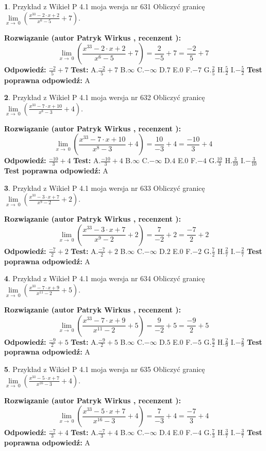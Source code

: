 \documentclass[12pt, a4paper]{article}
\theoremstyle{definition} %
\newtheorem{zad}{}
\newcommand{\zadStart}[1]{\begin{zad}#1\newline}
\newcommand{\zadStop}{\end{zad}}
\newcommand{\rozwStart}[2]{\noindent \textbf{Rozwiązanie (autor #1 , recenzent #2): }\newline}
\newcommand{\rozwStop}{\newline}
\newcommand{\odpStart}{\noindent \textbf{Odpowiedź:}\newline}
\newcommand{\odpStop}{\newline}
\newcommand{\testStart}{\noindent \textbf{Test:}\newline}
\newcommand{\testStop}{\newline}
\newcommand{\kluczStart}{\noindent \textbf{Test poprawna odpowiedź:}\newline}
\newcommand{\kluczStop}{\newline}
\begin{document}
\zadStart{Przykład z Wikieł P 4.1 moja wersja nr 631}
Obliczyć granicę $\lim\limits_{x\to\ 0}(\frac{x^{33}-2 \cdot x +2}{x^{6}-5}+7)$.
\zadStop
\rozwStart{Patryk Wirkus}{}
$$\lim\limits_{x\to\ 0}(\frac{x^{33}-2 \cdot x +2}{x^{6}-5}+7)=\frac{2}{-5}+7=\frac{-2}{5}+7$$
\rozwStop
\odpStart
$\frac{-2}{5}+7$
\odpStop
\testStart
A.$\frac{-2}{5}+7$
B.$\infty$
C.$-\infty$
D.$7$
E.$0$
F.$-7$
G.$\frac{2}{5}$
H.$\frac{5}{2}$
I.$-\frac{5}{2}$
\testStop
\kluczStart
A
\kluczStop



\zadStart{Przykład z Wikieł P 4.1 moja wersja nr 632}
Obliczyć granicę $\lim\limits_{x\to\ 0}(\frac{x^{33}-7 \cdot x +10}{x^{8}-3}+4)$.
\zadStop
\rozwStart{Patryk Wirkus}{}
$$\lim\limits_{x\to\ 0}(\frac{x^{33}-7 \cdot x +10}{x^{8}-3}+4)=\frac{10}{-3}+4=\frac{-10}{3}+4$$
\rozwStop
\odpStart
$\frac{-10}{3}+4$
\odpStop
\testStart
A.$\frac{-10}{3}+4$
B.$\infty$
C.$-\infty$
D.$4$
E.$0$
F.$-4$
G.$\frac{10}{3}$
H.$\frac{3}{10}$
I.$-\frac{3}{10}$
\testStop
\kluczStart
A
\kluczStop



\zadStart{Przykład z Wikieł P 4.1 moja wersja nr 633}
Obliczyć granicę $\lim\limits_{x\to\ 0}(\frac{x^{33}-3 \cdot x +7}{x^{9}-2}+2)$.
\zadStop
\rozwStart{Patryk Wirkus}{}
$$\lim\limits_{x\to\ 0}(\frac{x^{33}-3 \cdot x +7}{x^{9}-2}+2)=\frac{7}{-2}+2=\frac{-7}{2}+2$$
\rozwStop
\odpStart
$\frac{-7}{2}+2$
\odpStop
\testStart
A.$\frac{-7}{2}+2$
B.$\infty$
C.$-\infty$
D.$2$
E.$0$
F.$-2$
G.$\frac{7}{2}$
H.$\frac{2}{7}$
I.$-\frac{2}{7}$
\testStop
\kluczStart
A
\kluczStop



\zadStart{Przykład z Wikieł P 4.1 moja wersja nr 634}
Obliczyć granicę $\lim\limits_{x\to\ 0}(\frac{x^{33}-7 \cdot x +9}{x^{11}-2}+5)$.
\zadStop
\rozwStart{Patryk Wirkus}{}
$$\lim\limits_{x\to\ 0}(\frac{x^{33}-7 \cdot x +9}{x^{11}-2}+5)=\frac{9}{-2}+5=\frac{-9}{2}+5$$
\rozwStop
\odpStart
$\frac{-9}{2}+5$
\odpStop
\testStart
A.$\frac{-9}{2}+5$
B.$\infty$
C.$-\infty$
D.$5$
E.$0$
F.$-5$
G.$\frac{9}{2}$
H.$\frac{2}{9}$
I.$-\frac{2}{9}$
\testStop
\kluczStart
A
\kluczStop



\zadStart{Przykład z Wikieł P 4.1 moja wersja nr 635}
Obliczyć granicę $\lim\limits_{x\to\ 0}(\frac{x^{33}-5 \cdot x +7}{x^{16}-3}+4)$.
\zadStop
\rozwStart{Patryk Wirkus}{}
$$\lim\limits_{x\to\ 0}(\frac{x^{33}-5 \cdot x +7}{x^{16}-3}+4)=\frac{7}{-3}+4=\frac{-7}{3}+4$$
\rozwStop
\odpStart
$\frac{-7}{3}+4$
\odpStop
\testStart
A.$\frac{-7}{3}+4$
B.$\infty$
C.$-\infty$
D.$4$
E.$0$
F.$-4$
G.$\frac{7}{3}$
H.$\frac{3}{7}$
I.$-\frac{3}{7}$
\testStop
\kluczStart
A
\kluczStop
\end{document}
